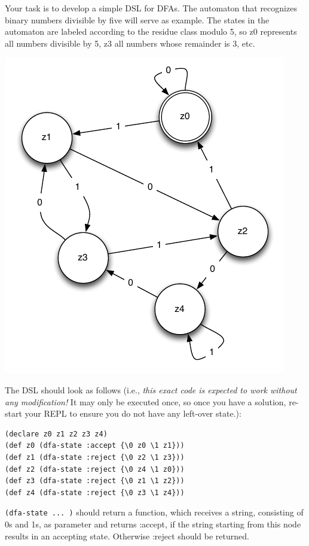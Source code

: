 \documentclass[11pt,a4paper]{article}
\begin{document}
\begin{exercise}[DFA]
Your task is to develop a simple DSL for DFAs.
The automaton that recognizes binary numbers divisible by five will serve as example.
The states in the automaton are labeled according to the residue class modulo 5,
so z0 represents all numbers divisible by 5, z3 all numbers whose remainder is 3, etc.

\begin{minipage}{.4\textwidth}
\includegraphics[scale=0.5]{dfa.png} 
\end{minipage}%
\begin{minipage}{.6\textwidth}
    The DSL should look as follows (i.e., \emph{this exact code is expected to work without any modification!} 
    It may only be executed once, so once you have a solution, re-start your REPL to ensure you do not have any left-over state.):

\begin{verbatim}
(declare z0 z1 z2 z3 z4)
(def z0 (dfa-state :accept {\0 z0 \1 z1}))
(def z1 (dfa-state :reject {\0 z2 \1 z3}))
(def z2 (dfa-state :reject {\0 z4 \1 z0}))
(def z3 (dfa-state :reject {\0 z1 \1 z2}))
(def z4 (dfa-state :reject {\0 z3 \1 z4}))
\end{verbatim}

\verb|(dfa-state ... )| should return a function,
which receives a string, consisting of 0s and 1s, as parameter and returns :accept,
if the string starting from this node results in an accepting state.
Otherwise :reject should be returned.
\end{minipage}


\end{exercise}
\end{document}
